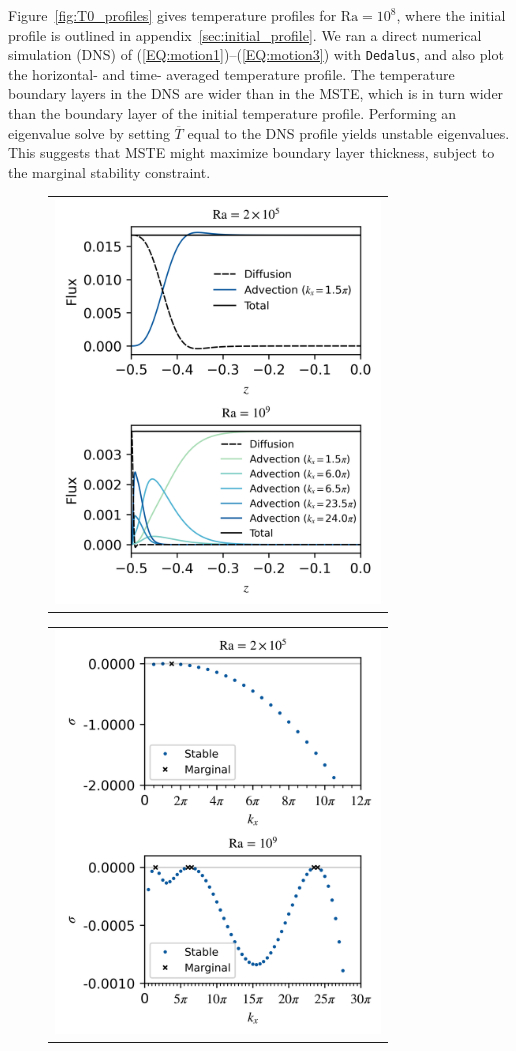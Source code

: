 \documentclass[reprint,amsmath,amssymb,aps,nofootinbib]{revtex4-1}
\newcommand\Ra{\mathrm{Ra}}
\newcommand{\eqss}[2]{(\ref{#1})--(\ref{#2})}
\begin{document}
Figure~\ref{fig:T0_profiles} gives temperature profiles for $\Ra = 10^8$, where the initial profile is outlined in appendix~\ref{sec:initial_profile}. 
We ran a direct numerical simulation (DNS) of \eqss{EQ:motion1}{EQ:motion3} with \texttt{Dedalus}, and also plot the horizontal- and time- averaged temperature profile. 
The temperature boundary layers in the DNS are wider than in the MSTE, which is in turn wider than the boundary layer of the initial temperature profile.
Performing an eigenvalue solve by setting $\overline{T}$ equal to the DNS profile yields unstable eigenvalues. 
This suggests that MSTE might maximize boundary layer thickness, subject to the marginal stability constraint.

\begin{figure}
    \centering
    \begin{tabular}{@{}c@{}}
        \includegraphics[width=3.4in]{flux_sup_n.png}
    \end{tabular}
    \begin{tabular}{@{}c@{}}
        \includegraphics[width=3.4in]{EV_spectra_2ra.png}

\end{tabular}
\end{figure}
\end{document}
